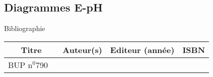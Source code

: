 \begin{headerBlock}
\chapter{Diagrammes E-pH}
\label{LC_DiagrammeEpH}
 \end{headerBlock}



\begin{reportBlock}{Bibliographie}

\begin{center}
\begin{tabular}{|c|c|c|c|}\hline
Titre & Auteur(s) & Editeur (année) & ISBN \\ \hline
BUP n$^0$790 ~ & ~ & ~ & ~ \\
\hline
\end{tabular}
\end{center}

\end{reportBlock}

